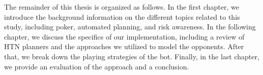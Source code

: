 The remainder of this thesis is organized as follows. In the first chapter, we introduce the background information on the different topics related to this study, including poker, automated planning, and risk awareness. In the following chapter, we discuss the specifics of our implementation, including a review of HTN planners and the approaches we utilized to model the opponents. After that, we break down the playing strategies of the bot. Finally, in the last chapter, we provide an evaluation of the approach and a conclusion.